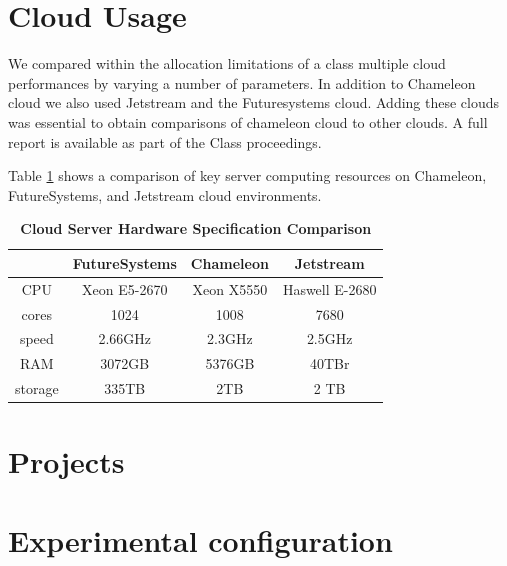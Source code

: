 \documentclass[sigconf]{acmart}
\begin{document}
\section{Cloud Usage}

We compared within the allocation limitations of a class multiple
cloud performances by varying a number of parameters.  In addition to
Chameleon cloud we also used Jetstream and the Futuresystems
cloud. Adding these clouds was essential to obtain comparisons of
chameleon cloud to other clouds.  A full report is available as part
of the Class proceedings.

Table \ref{T:cloud-comparison} shows a comparison of key server computing
resources on Chameleon, FutureSystems, and Jetstream cloud
environments.

\begin{table}[htbp]
\centering
\caption{\bf Cloud Server Hardware Specification Comparison \cite{www-chamHardware} \cite{www-kiloHardware} \cite{www-jetHardware}}

 \begin{tabular} {| c | c | c | c |}
\hline
  & FutureSystems &  Chameleon  & Jetstream \\ [0.5ex] 
 \hline

    
CPU     &     Xeon E5-2670 & Xeon X5550 & Haswell E-2680  \\
 \hline
cores &  1024             &        1008   &  7680 \\
 \hline
speed     &   2.66GHz           &               2.3GHz & 2.5GHz\\
 \hline
RAM   &     3072GB            &               5376GB  &  40TBr\\
 \hline
storage     &     335TB     &                   2TB  & 2 TB\\ [1ex] 
 \hline

\end{tabular}
  \label{T:cloud-comparison}
\end{table}


\section{Projects}


\section{Experimental configuration}
\end{document}
